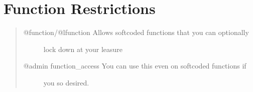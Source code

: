 \documentclass[letterpaper,10pt,english]{sphinxmanual}
\begin{document}
\section{Function Restrictions}
\label{\detokenize{08-lockdown:function-restrictions}}\begin{quote}
\begin{description}
\item[{@function/@lfunction \textendash{} Allows softcoded functions that you can optionally}] \leavevmode
\sphinxAtStartPar
lock down at your leasure

\item[{@admin function\_access \textendash{} You can use this even on softcoded functions if}] \leavevmode
\sphinxAtStartPar
you so desired.

\end{description}
\end{quote}
\end{document}
